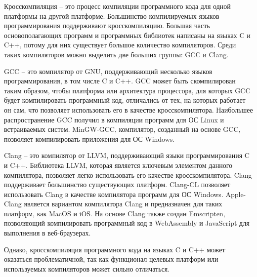 Кросскомпиляция -- это процесс компиляции программного кода для одной платформы на другой платформе.
Большинство компилируемых языков программирования поддерживают кросскомпиляцию.
Большая часть основополагающих программ и программных библиотек написаны на языках C и C++, потому для них существует большое количество компиляторов.
Среди таких компиляторов можно выделить две больших группы: GCC и Clang.

GCC -- это компилятор от GNU, поддерживающий несколько языков программирования, в том числе C и C++. 
GCC может быть скомпилирован таким образом, чтобы платформа или архитектура процессора, для которых GCC будет компилировать программный код, отличались от тех, на которых работает он сам, что позволяет использовать его в качестве кросскомпилятора.
Наибольшее распространение GCC получил в компиляции программ для ОС Linux и встраиваемых систем.
MinGW-GCC, компилятор, созданный на основе GCC, позволяет компилировать приложения для ОС Windows.

Clang -- это компилятор от LLVM, поддерживающий языки программирования C и C++.
Библиотека LLVM, которая является ключевым элементом данного компилятора, позволяет легко использовать его качестве кросскомпилятора. 
Clang поддерживает большинство существующих платформ.
Clang-CL позволяет использовать Clang в качестве компилятора программ для ОС Windows.
Apple-Clang является вариантом компилятора Clang и предназначен для таких платформ, как MacOS и iOS.
На основе Clang также создан Emscripten, позволяющий компилировать программный код в WebAssembly и JavaScript для выполнения в веб-браузерах.

Однако, кросскомпиляция программного кода на языках C и C++ может оказаться проблематичной, так как функционал целевых платформ или используемых компиляторов может сильно отличаться.



